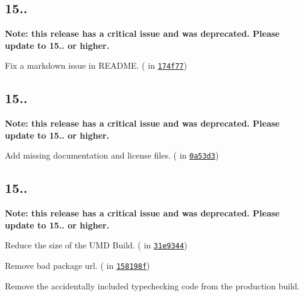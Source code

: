 \subsection*{15..}

{\bfseries Note\+: this release has a critical issue and was deprecated. Please update to 15.. or higher.}


\begin{DoxyItemize}
\item Fix a markdown issue in R\+E\+A\+D\+ME. (\href{https://github.com/bvaughn}{\tt } in \href{https://github.com/reactjs/prop-types/commit/174f77a50484fa628593e84b871fb40eed78b69a}{\tt 174f77})
\end{DoxyItemize}

\subsection*{15..}

{\bfseries Note\+: this release has a critical issue and was deprecated. Please update to 15.. or higher.}


\begin{DoxyItemize}
\item Add missing documentation and license files. (\href{https://github.com/bvaughn}{\tt } in \href{https://github.com/reactjs/prop-types/commit/0a53d3a34283ae1e2d3aa396632b6dc2a2061e6a}{\tt 0a53d3})
\end{DoxyItemize}

\subsection*{15..}

{\bfseries Note\+: this release has a critical issue and was deprecated. Please update to 15.. or higher.}


\begin{DoxyItemize}
\item Reduce the size of the U\+MD Build. (\href{https://github.com/acdlite}{\tt } in \href{https://github.com/reactjs/prop-types/commit/31e9344ca3233159928da66295da17dad82db1a8}{\tt 31e9344})
\item Remove bad package url. (\href{https://github.com/ljharb}{\tt } in \href{https://github.com/reactjs/prop-types/commit/158198fd6c468a3f6f742e0e355e622b3914048a}{\tt 158198f})
\item Remove the accidentally included typechecking code from the production build.
\end{DoxyItemize}

